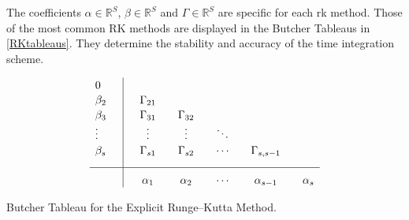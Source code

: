 	The coefficients $\alpha \in \mathbb{R}^S$, $\beta \in \mathbb{R}^S$ and $\Gamma \in \mathbb{R}^S$ are specific for each \gls{rk} method. Those of the most common RK methods are displayed in the Butcher Tableaus in \cref{RKtableaus}. They determine the stability and accuracy of the time integration scheme. \\ 
\begin{table}[h]
	\begin{equation*}
		\begin{array}{l | c c c c c}
			\rule{0pt}{2,3ex} 0      \quad &             &               &              &         &   \\
			\rule{0pt}{2,3ex} \beta_2    \quad & \quad \Gamma_{21}  &              &              &         &   \\
			\rule{0pt}{2,3ex} \beta_3    \quad & \quad \Gamma_{31}  & \quad \Gamma_{32}  &              &         &   \\
			\rule{0pt}{2,3ex} \vdots \quad & \quad \vdots & \quad \vdots & \quad \ddots &         &   \\
			\rule{0pt}{2,3ex} \beta_s    \quad & \quad \Gamma_{s1}  & \quad \Gamma_{s2}  & \quad \cdots & \quad \Gamma_{s,s-1} & \\[2,0ex] \hline
			\rule{0pt}{3,3ex}              & \quad \alpha_{1}  & \quad \alpha_{2}    & \quad \cdots & \quad \alpha_{s-1}  & \quad \alpha_{s}
		\end{array}
	\end{equation*}
	\caption{Butcher Tableau for the Explicit Runge–Kutta Method.}
	\label{tab:RKexplicit}
\end{table}		

